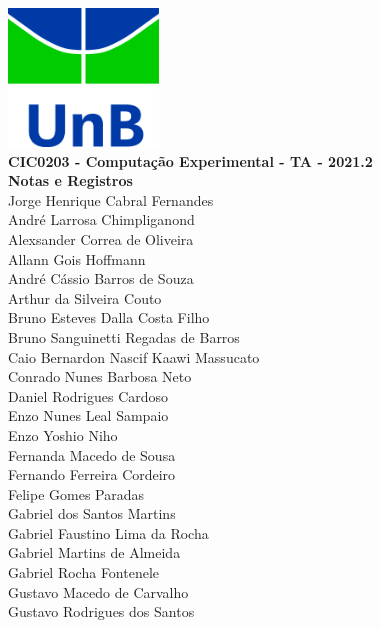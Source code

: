 \documentclass[12pt]{book}
\begin{document}
\clearpage
\thispagestyle{empty}

\begin{titlepage}
\begin{center}
 {\huge\bfseries \includegraphics[width=4cm]{unb-logo.jpg}\\
	CIC0203 - Computação Experimental - TA - 2021.2\\
	Notas e Registros\\}
 \vspace{1.5cm}
{\large	%
	Jorge Henrique Cabral Fernandes}\\
	André Larrosa Chimpliganond\\
	Alexsander Correa de Oliveira\\
	Allann Gois Hoffmann\\
	André Cássio Barros de Souza\\
	Arthur da Silveira Couto\\
	Bruno Esteves Dalla Costa Filho\\
	Bruno Sanguinetti Regadas de Barros\\
	Caio Bernardon Nascif Kaawi Massucato\\
	Conrado Nunes Barbosa Neto\\
	Daniel Rodrigues Cardoso\\
	Enzo Nunes Leal Sampaio\\
	Enzo Yoshio Niho\\
	Fernanda Macedo de Sousa \\
	Fernando Ferreira Cordeiro \\
	Felipe Gomes Paradas\\
	Gabriel dos Santos Martins\\
	Gabriel Faustino Lima da Rocha\\
	Gabriel Martins de Almeida\\
	Gabriel Rocha Fontenele\\
	Gustavo Macedo de Carvalho\\
	Gustavo Rodrigues dos Santos \\

\end{center}
\end{titlepage}
\end{document}
